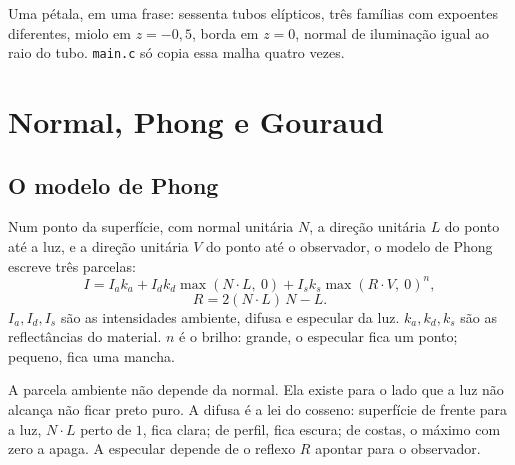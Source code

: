 \documentclass[11pt,a4paper]{article}
\newenvironment{figura}
  {\par\medskip\noindent\begin{minipage}{\linewidth}\centering}
  {\end{minipage}\par\medskip}
\newcommand{\fn}[1]{\texttt{\nobreak\hspace{0pt}#1}}
\begin{document}
\begin{voz}
Uma pétala, em uma frase: sessenta tubos elípticos, três famílias com expoentes diferentes, miolo em \(z = -0{,}5\), borda em \(z = 0\), normal de iluminação igual ao raio do tubo. \fn{main.c} só copia essa malha quatro vezes.
\end{voz}

\section{Normal, Phong e Gouraud}
\label{sec:luz}

\subsection{O modelo de Phong}

Num ponto da superfície, com normal unitária \(N\), a direção unitária \(L\) do ponto até a luz, e a direção unitária \(V\) do ponto até o observador, o modelo de Phong escreve três parcelas:
\begin{equation}
  I = I_a k_a + I_d k_d \max(N\cdot L,\ 0) + I_s k_s \max(R\cdot V,\ 0)^{n},
  \label{eq:phong}
\end{equation}
\begin{equation}
  R = 2 (N\cdot L)\, N - L .
  \label{eq:reflex}
\end{equation}
\(I_a, I_d, I_s\) são as intensidades ambiente, difusa e especular da luz. \(k_a, k_d, k_s\) são as reflectâncias do material. \(n\) é o brilho: grande, o especular fica um ponto; pequeno, fica uma mancha.

A parcela ambiente não depende da normal. Ela existe para o lado que a luz não alcança não ficar preto puro. A difusa é a lei do cosseno: superfície de frente para a luz, \(N\cdot L\) perto de \(1\), fica clara; de perfil, fica escura; de costas, o máximo com zero a apaga. A especular depende de o reflexo \(R\) apontar para o observador.

\begin{figura}
\end{figura}
\end{document}

